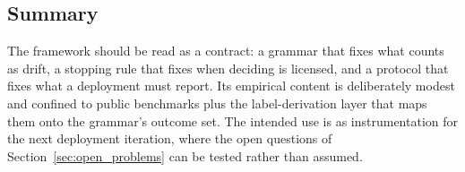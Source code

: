 \subsection{Summary}

The framework should be read as a contract: a grammar that fixes what counts as drift, a stopping rule that fixes when deciding is licensed, and a protocol that fixes what a deployment must report.
Its empirical content is deliberately modest and confined to public benchmarks plus the label-derivation layer that maps them onto the grammar's outcome set.
The intended use is as instrumentation for the next deployment iteration, where the open questions of Section~\ref{sec:open_problems} can be tested rather than assumed.
